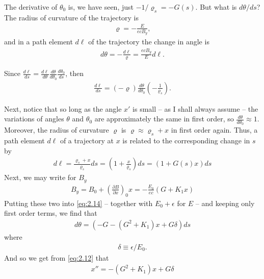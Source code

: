 The derivative of $\theta_0$ is, we have seen, just $-1/\varrho_s = -G(s)$. But what is $d\theta/ds$? The radius of curvature of the trajectory is
\begin{align} \label{eq:2.13}
	\varrho = -\frac{E}{ecB_y},
\end{align}
and in a path element $d\ell$ of the trajectory the change in angle is
\begin{align}
	d\theta = -\frac{d\ell}{\varrho} = \frac{ecB_y}{E}d\ell\label{eq:2.14}.
\end{align}

Since $\frac{d\ell}{ds} = \frac{d\ell}{d\theta}\frac{d\theta}{d\theta_0}\frac{d\theta_0}{ds}$, then
\begin{align*}
\frac{d\ell}{ds} = \left(-\varrho\right)\frac{d\theta}{d\theta_0}\left(-\frac{1}{\varrho_s}\right).
\end{align*}

Next, notice that so long as the angle $x'$ is small -- as I shall always assume -- the variations of angles $\theta$ and $\theta_0$ are approximately the same in first order, so $\frac{d\theta}{d\theta_0} \approx 1$. Moreover, the radius of curvature $\varrho$ is $\varrho \approx \varrho_s + x$ in first order again. Thus, a path element $d\ell$ of a trajectory at $x$ is related to the corresponding change in $s$ by
\begin{align}
	d\ell = \frac{\varrho_s + x}{\varrho_s} ds = \left(1+\frac{x}{\varrho_s}\right)ds = (1+G(s)x)ds\label{eq:2.15}
\end{align}
Next, we may write for $B_y$
\begin{align}
	B_y = B_0 + \left(\frac{\partial B}{\partial x}\right)_0 x = -\frac{E_0}{ec}(G+K_1x)\label{eq:2.16}
\end{align}
Putting these two into \eqref{eq:2.14} -- together with $E_0 + \epsilon$ for $E$ -- and keeping only first order terms, we find that
\begin{align*}
	d\theta = \left(-G-(G^2+K_1)x + G\delta\right)ds
\end{align*}
where
\begin{align}
	\delta \equiv \epsilon / E_0.
\end{align}
And so we get from \eqref{eq:2.12} that
\begin{align}\label{eq:2.17}
	x'' = -(G^ 2+K_1)x + G\delta
\end{align}

